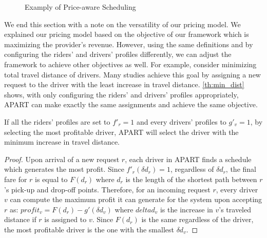 \begin{figure}[!ht]
	\centering
	\vspace{-2mm}\caption{Examply of Price-aware Scheduling} \vspace{-2mm} \label{fig:quality_eg}
\end{figure}\vspace{-0mm}

We end this section with a note on the versatility of our pricing model. We explained our pricing model based on the objective of our framework which is maximizing the provider's revenue. However, using the same definitions and by configuring the riders' and drivers' profiles differently, we can adjust the framework to achieve other objectives as well. For example, consider minimizing total travel distance of drivers. Many studies \cite{Ma13,Huang14,Ma15} achieve this goal by assigning a new request to the driver with the least increase in travel distance. \cref{th:min_dist} shows, with only configuring the riders' and drivers' profiles appropriately, APART can make exactly the same assignments and achieve the same objective.

\begin{theorem}
\label{th:min_dist}
If all the riders' profiles are set to $f'_r = 1$ and every drivers' profiles to $g'_v = 1$, by selecting the most profitable driver, APART will select the driver with the minimum increase in travel distance.
\end{theorem}

\begin{proof}
Upon arrival of a new request $r$, each driver in APART finds a schedule which generates the most profit. Since $f'_r(\delta d_r) = 1$, regardless of $\delta d_r$, the final fare for $r$ is equal to $F(d_r)$ where $d_r$ is the length of the shortest path between $r$'s pick-up and drop-off points. Therefore, for an incoming request $r$, every driver $v$ can compute the maximum profit it can generate for the system upon accepting $r$ as: $profit_v = F(d_r) - g'(\delta d_v)$ where $delta d_v$ is the increase in $v$'s traveled distance if $r$ is assigned to $v$. Since $F(d_r)$ is the same regardless of the driver, the most profitable driver is the one with the smallest $\delta d_v$.
\end{proof}